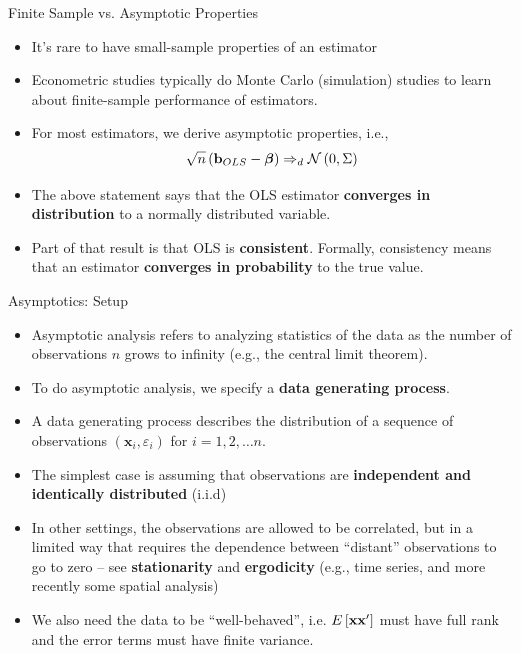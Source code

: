 \begin{frame}{Finite Sample vs. Asymptotic Properties}
\begin{itemize}
	\item It's rare to have small-sample properties of an estimator

	\medskip
	\item Econometric studies typically do Monte Carlo (simulation) studies to learn
	about finite-sample performance of estimators. 

	\medskip
	\item For most estimators, we derive asymptotic properties, i.e., \[
	\sqrt{n} \left({\bf b}_{OLS} - \boldsymbol{\beta}\right) \Rightarrow_{d} \mathcal{N}\left(0, \Sigma\right)
	\]

	\item The above statement says that the OLS estimator
	 {\bf converges in distribution} to a normally distributed variable.

	\item Part of that result is that OLS is {\bf consistent}. Formally, consistency means that an estimator
	{\bf converges in probability} to the true value. 
\end{itemize}
\end{frame}



\begin{frame}{Asymptotics: Setup}
\begin{itemize}

	\item Asymptotic analysis refers to analyzing statistics of the data as the number of observations $n$
	grows to infinity (e.g., the central limit theorem).

	\item To do asymptotic analysis, we specify a {\bf data generating process}. 
	
	\item A data generating process describes the distribution of 
	 a sequence of observations $\left(\boldsymbol{x}_{i},\varepsilon_{i}\right)$ 	for $i=1,2,\dots n$. 


	\item The simplest case is assuming that observations are {\bf independent and identically distributed}
	(i.i.d)

	\item In other settings, the observations are allowed to be correlated, but in a limited way 
	that requires the dependence between ``distant'' observations to go to zero -- see {\bf stationarity}
	and {\bf ergodicity} (e.g., time series, and 	more recently some spatial analysis)

	\item We also need the data to be ``well-behaved'', i.e. $E\left[{\bf x} {\bf x}' \right]$ must have
	full rank and the error terms must have finite variance. 

\end{itemize}
\end{frame}



